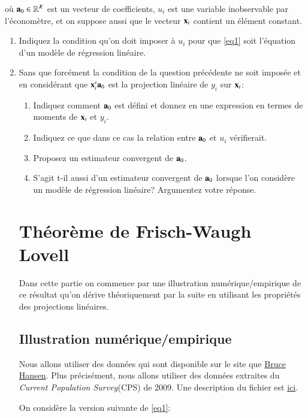 où ${\mathbf a}_0\in \mathbb{R}^K$ est un vecteur de coefficients, $u_i$ est une variable inobservable par l'économètre, et on suppose aussi
que le vecteur ${\mathbf x}_i$ contient un élément constant.

\begin{enumerate}
\item Indiquez la condition qu'on doit imposer à $u_i$ pour que \eqref{eq1} soit l'équation d'un modèle de régression linéaire.
\item Sans que forcément la condition de la question précédente ne soit imposée et en considérant que ${\mathbf x}_i^\prime{\mathbf a}_0$
est la projection linéaire de $y_i$ sur ${\mathbf x}_i$:
\begin{enumerate}
  \item Indiquez comment ${\mathbf a}_0$ est défini et donnez en une expression en termes de moments de ${\mathbf x}_i$ et $y_i$.
  \item Indiquez ce que dans ce cas la relation entre ${\mathbf a}_0$ et $u_i$ vérifierait.
  \item Proposez un estimateur convergent de ${\mathbf a}_0$.
  \item S'agit t-il aussi d'un estimateur convergent de ${\mathbf a}_0$ lorsque l'on considère un modèle de régression linéaire? Argumentez votre réponse.
\end{enumerate}

\section{Théorème de Frisch-Waugh Lovell}

Dans cette partie on commence par une illustration numérique/empirique de ce résultat qu'on dérive théoriquement par la suite 
en utilisant les propriétés des projections linéaires.

\subsection{Illustration numérique/empirique}

Nous allons utiliser des données qui sont 
disponible sur le site que \href{https://www.ssc.wisc.edu/~bhansen/}{Bruce Hansen}. 
Plus précisément, nous allons utiliser des données extraites du \emph{Current Population Survey}(CPS) de 2009. 
Une description du fichier est \href{https://www.ssc.wisc.edu/~bhansen/econometrics/cps09mar_description.pdf}{ici}.

\medskip

On considère la version suivante de \eqref{eq1}:


\end{enumerate}

